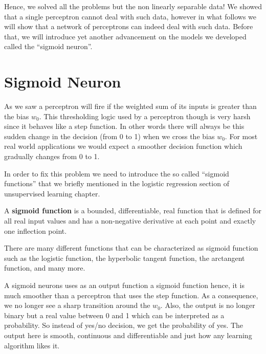 Hence, we solved all the problems but the non linearly separable data! We showed that a single perceptron cannot deal
with such data, however in what follows we will show that a network of perceptrons can indeed deal with such data.
Before that, we will introduce yet another advancement on the models we developed called the ``sigmoid neuron''.

\section{Sigmoid Neuron}

As we saw a perceptron will fire if the weighted sum of its inputs is greater than the bias $w_0$. This thresholding
logic used by a perceptron though is very harsh since it behaves like a step function. In other words there will
always be this sudden change in the decision (from 0 to 1) when we cross the bias $w_0$. For most real world
applications we would expect a smoother decision function which gradually changes from 0 to 1.


In order to fix this problem we need to introduce the so called ``sigmoid functions'' that we briefly mentioned in
the logistic regression section of unsupervised learning chapter.

A \textbf{sigmoid function} is a bounded, differentiable, real function that is defined for all real input values and
has a non-negative derivative at each point and exactly one inflection point.
\ed

There are many different functions that can be characterized as sigmoid function such as the logistic function, the
hyperbolic tangent function, the arctangent function, and many more.


A sigmoid neurons uses as an output function a sigmoid function hence, it is much smoother than a perceptron that uses
the step function. As a consequence, we no longer see a sharp transition around the $w_0$. Also, the output is no
longer binary but a real value between 0 and 1 which can be interpreted as a probability. So instead of yes/no
decision, we get the probability of yes. The output here is smooth, continuous and differentiable and just how any
learning algorithm likes it.

\vspace{10pt}


